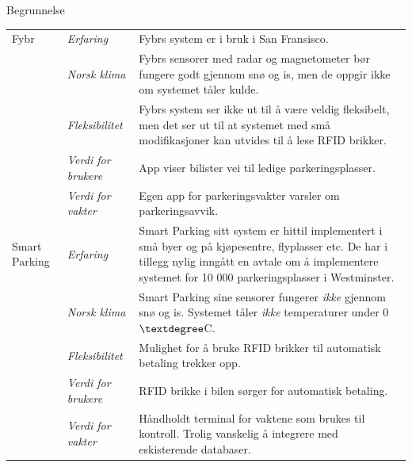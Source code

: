 \documentclass[xetex]{beamer}
\begin{document}
\begin{frame}\label{fr:begrunnelse}
	\begin{center}
		\large{Begrunnelse}
	\end{center}
	
	\begin{tabular}{llp{7cm}}
	\alert{Fybr} 			& \emph{Erfaring} 		& Fybrs system er i bruk i \alert{San Fransisco}. \\ [0.5em]
							& \emph{Norsk klima}	& Fybrs sensorer med radar og magnetometer \alert{bør fungere godt gjennom snø og is}, men de oppgir ikke om systemet tåler kulde. \\
							& \emph{Fleksibilitet}	& Fybrs system ser ikke ut til å være veldig fleksibelt, men det ser ut til at systemet med små modifikasjoner kan utvides til å lese RFID brikker. \\
							& \emph{Verdi for brukere} & App viser bilister vei til ledige parkeringsplasser. \\ [0.5em]
							& \emph{Verdi for vakter} & Egen \alert{app for parkeringsvakter} varsler om parkeringsavvik. \\ [2em]
	\alert{Smart Parking} 	& \emph{Erfaring} 		& Smart Parking sitt system er hittil implementert i små byer og på kjøpesentre, flyplasser etc. De har i tillegg nylig inngått en avtale om å implementere systemet for 10 000 parkeringsplasser i Westminster. \\ [0.5em]
							& \emph{Norsk klima} 	& Smart Parking sine sensorer \alert{fungerer \emph{ikke} gjennom snø og is}. Systemet \alert{tåler \emph{ikke} temperaturer under 0$\textdegree$C}.  \\ [0.5em]
							& \emph{Fleksibilitet} 	& Mulighet for å bruke \alert{RFID brikker} til automatisk betaling trekker opp. \\ [0.5em]
							& \emph{Verdi for brukere} & RFID brikke i bilen sørger for \alert{automatisk betaling}. \\ [0.5em]
							& \emph{Verdi for vakter} & Håndholdt terminal for vaktene som brukes til kontroll. \alert{Trolig vanskelig å integrere med eskisterende databaser}. \\ [0.5em]
	\end{tabular}
\end{frame}
\end{document}

